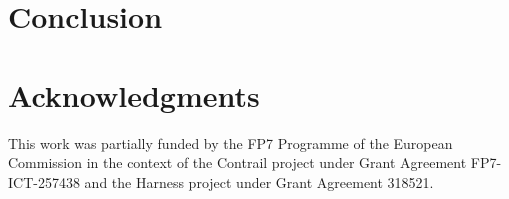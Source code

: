 \documentclass[conference]{IEEEtran}
\begin{document}
\section{Conclusion}
\label{sec:conclusion}



\section*{Acknowledgments}

This work was partially funded by the FP7 Programme of the European
Commission in the context of the Contrail project under Grant
Agreement FP7-ICT-257438 and the Harness project under Grant Agreement
318521.




\end{document}
